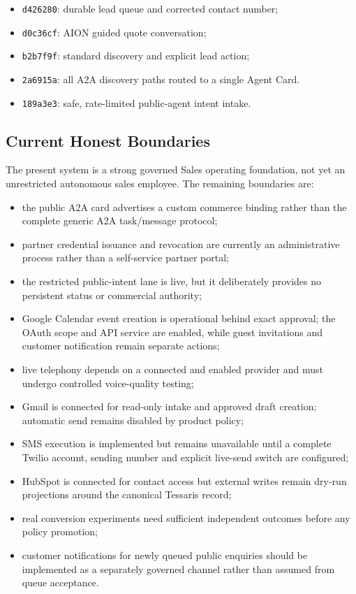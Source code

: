 \begin{itemize}
  \item \texttt{d426280}: durable lead queue and corrected contact number;
  \item \texttt{d0c36cf}: AION guided quote conversation;
  \item \texttt{b2b7f9f}: standard discovery and explicit lead action;
  \item \texttt{2a6915a}: all A2A discovery paths routed to a single Agent Card.
  \item \texttt{189a3e3}: safe, rate-limited public-agent intent intake.
\end{itemize}

\subsection{Current Honest Boundaries}

The present system is a strong governed Sales operating foundation, not yet an unrestricted autonomous sales employee.  The remaining boundaries are:

\begin{itemize}
  \item the public A2A card advertises a custom commerce binding rather than the complete generic A2A task/message protocol;
  \item partner credential issuance and revocation are currently an administrative process rather than a self-service partner portal;
  \item the restricted public-intent lane is live, but it deliberately provides no persistent status or commercial authority;
  \item Google Calendar event creation is operational behind exact approval; the OAuth scope and API service are enabled, while guest invitations and customer notification remain separate actions;
  \item live telephony depends on a connected and enabled provider and must undergo controlled voice-quality testing;
  \item Gmail is connected for read-only intake and approved draft creation; automatic send remains disabled by product policy;
  \item SMS execution is implemented but remains unavailable until a complete Twilio account, sending number and explicit live-send switch are configured;
  \item HubSpot is connected for contact access but external writes remain dry-run projections around the canonical Tessaris record;
  \item real conversion experiments need sufficient independent outcomes before any policy promotion;
  \item customer notifications for newly queued public enquiries should be implemented as a separately governed channel rather than assumed from queue acceptance.
\end{itemize}

